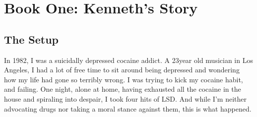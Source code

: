 \documentclass[a5paper,10pt,english]{book}
\begin{document}
\egroup
\mainmatter
\let\subsubsection\subsection
\let\subsection\section
\let\section\chapter
\let\chapter\part

\sphinxstepscope


\chapter{Book One: Kenneth’s Story}
\label{\detokenize{main-1:book-one-kenneth-s-story}}\label{\detokenize{main-1::doc}}

\section{The Setup}
\label{\detokenize{main-1:the-setup}}
\sphinxAtStartPar
In 1982, I was a suicidally depressed cocaine addict. A 23\sphinxhyphen{}year old
musician in Los Angeles, I had a lot of free time to sit around being
depressed and wondering how my life had gone so terribly wrong. I was
trying to kick my cocaine habit, and failing. One night, alone at home,
having exhausted all the cocaine in the house and spiraling into
despair, I took four hits of LSD. And while I’m neither advocating drugs
nor taking a moral stance against them, this is what happened.
\end{document}
